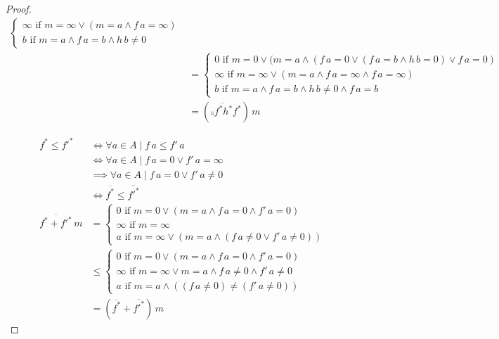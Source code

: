 \documentclass[runningheads,envcountsame]{llncs}
\begin{document}
\begin{proof}
\begin{align}
\begin{cases}
            \infty \text{ if } m = \infty \vee (m = a \wedge f\,a = \infty) \\
            b \text{ if } m = a \wedge f\,a = b \wedge h\,b \neq 0
        \end{cases} \\
        &= \begin{cases}
            0 \text{ if } m = 0 \vee (m = a \wedge (f\,a = 0 \vee (f\,a = b \wedge h\,b = 0) \vee f\,a = 0) \\
            \infty \text{ if } m = \infty \vee (m = a \wedge f\,a = \infty \wedge f\,a = \infty) \\
            b \text{ if } m = a \wedge f\,a = b \wedge h\,b \neq 0 \wedge f\,a = b
        \end{cases} \\
        &= (\comp{\overline{\comp{f^*}{h^*}}}{f^*})\,m
    \end{align}
    
    \begin{align}
        f^* \leq f'^* & \iff \forall a \in A \mid f\,a \leq f'\,a \\
        & \iff \forall a \in A \mid f\,a = 0 \vee f'\,a = \infty \\
        & \implies \forall a \in A \mid f\,a = 0 \vee f'\,a \neq 0 \\
        & \iff \overline{f^*} \leq \overline{f'^*} \\
        \overline{f^* + f'^*}\,m &= \begin{cases}
            0 \text{ if } m = 0 \vee (m = a \wedge f\,a = 0 \wedge f'\,a = 0) \\
            \infty \text{ if } m = \infty \\
            a \text{ if } m = \infty \vee (m = a \wedge  (f\,a \neq 0 \vee f'\,a \neq 0))
        \end{cases} \\
        &\leq \begin{cases}
            0 \text{ if } m = 0 \vee (m = a \wedge f\,a = 0 \wedge f'\,a = 0) \\
            \infty \text{ if } m = \infty \vee m = a \wedge f\,a \neq 0 \wedge f'\,a \neq 0 \\
            a \text{ if } m = a \wedge ((f\,a \neq 0) \neq (f'\,a \neq 0))
        \end{cases} \\
        &= (\overline{f^*} + \overline{f'^*})\,m
    \end{align}
    

\end{proof}
\end{document}
